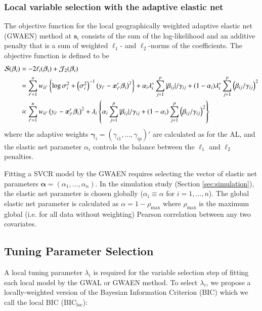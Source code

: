 \documentclass[authoryear, review, 11pt]{elsarticle}
\begin{document}
	\subsubsection{Local variable selection with the adaptive elastic net}
	The objective function for the local geographically weighted adaptive elastic net (GWAEN) method at $\bm{s}_i$ consists of the sum of the log-likelihood and an additive penalty that is a sum of weighted $\ell_1$- and $\ell_2$-norms of the coefficients. The objective function is defined to be
	\begin{align}
		\mathcal{S}(\bm{\beta}_i) &= -2 \ell_i(\bm{\beta}_i) + \mathcal{J}_2(\bm{\beta}_i) \notag \\
		&= \sum_{i'=1}^n w_{ii'}  \left\{ \log{\sigma^2_i}  + \left(\sigma^2_i\right)^{-1}  \left(y_{i'} - \bm{x}'_{i'} \bm{\beta}_i \right)^2 \right\} + \alpha_i \lambda^*_i \sum_{j=1}^p |\beta_{ij}| / \gamma_{ij} + (1-\alpha_i) \lambda^*_i \sum_{j=1}^p  \left( \beta_{ij} / \gamma_{ij} \right)^2 \notag \\
		&\propto \sum_{i'=1}^n w_{ii'} \left(y_{i'} - \bm{x}'_{i'} \bm{\beta}_i \right)^2 + \lambda_i \left\{\alpha_i \sum_{j=1}^p |\beta_{ij}| / \gamma_{ij} + (1-\alpha_i) \sum_{j=1}^p  \left( \beta_{ij} / \gamma_{ij} \right)^2 \right\}
	\end{align}	
	where the adaptive weights $\bm{\gamma}_i = \left(\gamma_{i1}, \dots, \gamma_{ip}\right)'$ are calculated as for the AL, and the elastic net parameter $\alpha_i$ controls the balance between the $\ell_1$ and $\ell_2$ penalties.
	
	Fitting a SVCR model by the GWAEN requires selecting the vector of elastic net parameters $\bm{\alpha} = \left( \alpha_1, \dots, \alpha_n \right)$. In the simulation study (Section \ref{sec:simulation}), the elastic net parameter is chosen globally ($\alpha_i \equiv \alpha$ for $i=1, \dots, n$). The global elastic net parameter is calculated as $\alpha = 1-\rho_{\text{max}}$ where $\rho_{\text{max}}$ is the maximum global (i.e. for all data without weighting) Pearson correlation between any two covariates.

	\subsection{Tuning Parameter Selection}	
	A local tuning parameter $\lambda_i$ is required for the variable selection step of fitting each local model by the GWAL or GWAEN method. To select $\lambda_i$, we propose a locally-weighted version of the Bayesian Information Criterion (BIC) \citep{Schwarz-1978} which we call the local BIC ($\text{BIC}_{\text{loc}}$):
	
\end{document}

